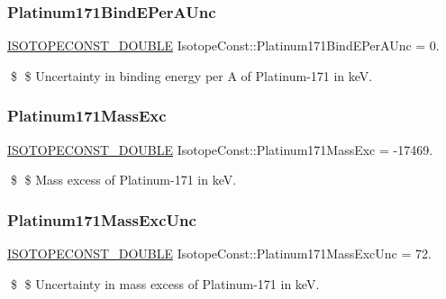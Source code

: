 \subsubsection{\texorpdfstring{Platinum171\+Bind\+E\+Per\+A\+Unc}{Platinum171BindEPerAUnc}}
{\footnotesize\ttfamily \mbox{\hyperlink{group___isotope_const-_macros_ga8f45a7272ce02c0b4c65c44636ed719a}{I\+S\+O\+T\+O\+P\+E\+C\+O\+N\+S\+T\+\_\+\+D\+O\+U\+B\+LE}} Isotope\+Const\+::\+Platinum171\+Bind\+E\+Per\+A\+Unc = 0.}

\$ \$ Uncertainty in binding energy per A of Platinum-\/171 in keV. \mbox{\label{group___isotope_const-_platinum-_pt171_gaf8451610fa2af4ca5a83cda0adcd2fb3}} 
\subsubsection{\texorpdfstring{Platinum171\+Mass\+Exc}{Platinum171MassExc}}
{\footnotesize\ttfamily \mbox{\hyperlink{group___isotope_const-_macros_ga8f45a7272ce02c0b4c65c44636ed719a}{I\+S\+O\+T\+O\+P\+E\+C\+O\+N\+S\+T\+\_\+\+D\+O\+U\+B\+LE}} Isotope\+Const\+::\+Platinum171\+Mass\+Exc = -\/17469.}

\$ \$ Mass excess of Platinum-\/171 in keV. \mbox{\label{group___isotope_const-_platinum-_pt171_ga4875d72ab24ec1b653f6c68b185e0cc7}} 
\subsubsection{\texorpdfstring{Platinum171\+Mass\+Exc\+Unc}{Platinum171MassExcUnc}}
{\footnotesize\ttfamily \mbox{\hyperlink{group___isotope_const-_macros_ga8f45a7272ce02c0b4c65c44636ed719a}{I\+S\+O\+T\+O\+P\+E\+C\+O\+N\+S\+T\+\_\+\+D\+O\+U\+B\+LE}} Isotope\+Const\+::\+Platinum171\+Mass\+Exc\+Unc = 72.}

\$ \$ Uncertainty in mass excess of Platinum-\/171 in keV. \mbox{\label{group___isotope_const-_platinum-_pt171_ga9218359d7026bc1018a598552179cd40}} 

